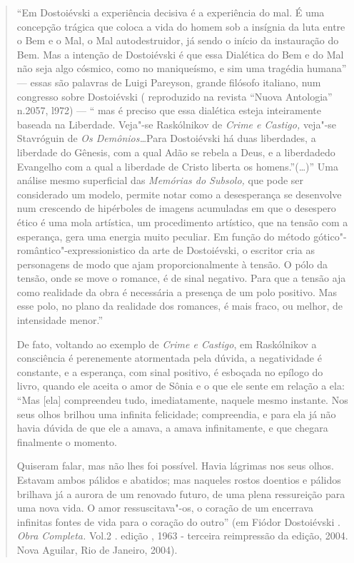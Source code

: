 \begin{quote}
``Em Dostoiévski a experiência decisiva é a experiência do mal. É uma
concepção trágica que coloca a vida do homem sob a insígnia da luta
entre o Bem e o Mal, o Mal autodestruidor, já sendo o início da
instauração do Bem. Mas a intenção de Dostoiévski é que essa Dialética
do Bem e do Mal não seja algo cósmico, como no maniqueísmo, e sim uma
tragédia humana'' --- essas são palavras de Luigi Pareyson, grande
filósofo italiano, num congresso sobre Dostoiévski ( reproduzido na
revista ``Nuova Antologia'' n.2057, l972) --- `` mas é preciso que essa
dialética esteja inteiramente baseada na Liberdade. Veja"-se Raskólnikov
de \emph{Crime e Castigo,} veja"-se Stavróguin de \emph{Os
Demônios\ldots{}}Para Dostoiévski há duas liberdades, a liberdade do Gênesis,
com a qual Adão se rebela a Deus, e a liberdadedo Evangelho com a qual a
liberdade de Cristo liberta os homens.''(\ldots{})'' Uma análise mesmo
superficial das \emph{Memórias do Subsolo,} que pode ser considerado um
modelo, permite notar como a desesperança se desenvolve num crescendo de
hipérboles de imagens acumuladas em que o desespero ético é uma mola
artística, um procedimento artístico, que na tensão com a esperança,
gera uma energia muito peculiar. Em função do método
gótico"-romântico"-expressionistico da arte de Dostoiévski, o escritor
cria as personagens de modo que ajam proporcionalmente à tensão. O pólo
da tensão, onde se move o romance, é de sinal negativo. Para que a
tensão aja como realidade da obra é necessária a presença de um polo
positivo. Mas esse polo, no plano da realidade dos romances, é mais
fraco, ou melhor, de intensidade menor.''

De fato, voltando ao exemplo de \emph{Crime e Castigo}, em Raskólnikov a
consciência é perenemente atormentada pela dúvida, a negatividade é
constante, e a esperança, com sinal positivo, é esboçada no epílogo do
livro, quando ele aceita o amor de Sônia e o que ele sente em relação a
ela: ``Mas {[}ela{]} compreendeu tudo, imediatamente, naquele mesmo
instante. Nos seus olhos brilhou uma infinita felicidade; compreendia, e
para ela já não havia dúvida de que ele a amava, a amava infinitamente,
e que chegara finalmente o momento.

Quiseram falar, mas não lhes foi possível. Havia lágrimas nos seus
olhos. Estavam ambos pálidos e abatidos; mas naqueles rostos doentios e
pálidos brilhava já a aurora de um renovado futuro, de uma plena
ressureição para uma nova vida. O amor ressuscitava"-os, o coração de um
encerrava infinitas fontes de vida para o coração do outro'' (em Fiódor
Dostoiévski . \emph{Obra Completa.} Vol.2 .  edição , 1963 - terceira
reimpressão da  edição, 2004. Nova Aguilar, Rio de Janeiro, 2004).


\end{quote}
